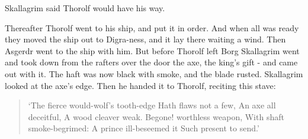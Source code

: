 Skallagrim said Thorolf would have his way.

Thereafter Thorolf went to his ship, and put it in order. And when all was ready they moved the ship out to Digra-ness, and it lay there waiting a wind. Then Asgerdr went to the ship with him. But before Thorolf left Borg Skallagrim went and took down from the rafters over the door the axe, the king's gift - and came out with it. The haft was now black with smoke, and the blade rusted. Skallagrim looked at the axe's edge. Then he handed it to Thorolf, reciting this stave:

\begin{verse}
`The fierce would-wolf's tooth-edge
Hath flaws not a few,
An axe all deceitful,
A wood cleaver weak.
Begone! worthless weapon,
With shaft smoke-begrimed:
A prince ill-beseemed it
Such present to send.'
\end{verse}